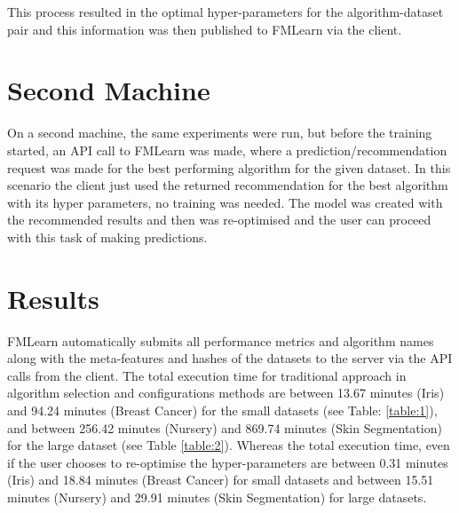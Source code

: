 This process resulted in the optimal hyper-parameters for the algorithm-dataset pair and this information was then published to FMLearn via the client.
 
\section*{Second Machine}

On a second machine, the same experiments were run, but before the training started, an API call to FMLearn was made, where a prediction/recommendation request was made for the best performing algorithm for the given dataset. In this scenario the client just used the returned recommendation for the best algorithm with its hyper parameters, no training was needed. The model was created with the recommended results and then was re-optimised and the user can proceed with this task of making predictions.

\section{Results}

FMLearn automatically submits all performance metrics and algorithm names along with the meta-features and hashes of the datasets to the server via the API calls from the client. The total execution time for traditional approach in algorithm selection and configurations methods are between 13.67 minutes (Iris) and 94.24 minutes (Breast Cancer) for the small datasets (see Table: \ref{table:1}), and between 256.42 minutes (Nursery) and 869.74 minutes (Skin Segmentation) for the large dataset (see Table \ref{table:2}). Whereas the total execution time, even if the user chooses to re-optimise the hyper-parameters are between 0.31 minutes (Iris) and 18.84 minutes (Breast Cancer) for small datasets and between 15.51 minutes (Nursery) and 29.91 minutes (Skin Segmentation) for large datasets.

